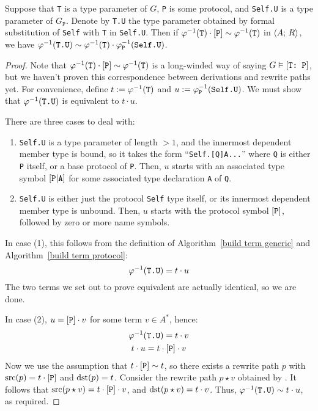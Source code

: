\documentclass[../generics]{subfiles}
\begin{document}
\begin{lemma}\label{type param composition lemma}
Suppose that \texttt{T} is a type parameter of $G$, \texttt{P} is some protocol, and \texttt{Self.U} is a type parameter of $G_\texttt{P}$. Denote by \texttt{T.U} the type parameter obtained by formal substitution of \texttt{Self} with \texttt{T} in \texttt{Self.U}. Then if $\varphi^{-1}(\texttt{T})\cdot[\texttt{P}]\sim\varphi^{-1}(\texttt{T})$ in $\langle A;\,R\rangle$, we have $\varphi^{-1}(\texttt{T.U})\sim\varphi^{-1}(\texttt{T})\cdot\varphi^{-1}_\texttt{P}(\texttt{Self.U})$.
\end{lemma}
\begin{proof}
Note that $\varphi^{-1}(\texttt{T})\cdot[\texttt{P}]\sim\varphi^{-1}(\texttt{T})$ is a long-winded way of saying $G\vDash[\texttt{T:~P}]$, but we haven't proven this correspondence between derivations and rewrite paths yet. For convenience, define $t:=\varphi^{-1}(\texttt{T})$ and $u:=\varphi^{-1}_\texttt{P}(\texttt{Self.U})$. We must show that $\varphi^{-1}(\texttt{T.U})$ is equivalent to $t\cdot u$.

There are three cases to deal with:
\begin{enumerate}
\item \texttt{Self.U} is a type parameter of length $>1$, and the innermost dependent member type is bound, so it takes the form ``\texttt{Self.[Q]A...}'' where \texttt{Q} is either \texttt{P} itself, or a base protocol of \texttt{P}. Then, $u$ starts with an associated type symbol $[\texttt{P}|\texttt{A}]$ for some associated type declaration \texttt{A} of \texttt{Q}.
\item \texttt{Self.U} is either just the protocol \texttt{Self} type itself, or its innermost dependent member type is unbound. Then, $u$ starts with the protocol symbol $[\texttt{P}]$, followed by zero or more name symbols.
\end{enumerate}

In case (1), this follows from the definition of Algorithm~\ref{build term generic} and Algorithm~\ref{build term protocol}:
\[\varphi^{-1}(\texttt{T.U})=t\cdot u\]
The two terms we set out to prove equivalent are actually identical, so we are done.

In case (2), $u=[\texttt{P}]\cdot v$ for some term $v\in A^*$, hence:
\begin{gather*}
\varphi^{-1}(\texttt{T.U})=t\cdot v\\
t\cdot u=t\cdot [\texttt{P}]\cdot v
\end{gather*}
Now we use the assumption that $t\cdot[\texttt{P}]\sim t$, so there exists a rewrite path $p$ with $\operatorname{src}(p)=t\cdot[\texttt{P}]$ and $\operatorname{dst}(p)=t$. Consider the rewrite path $p\star v$ obtained by . It follows that $\operatorname{src}(p\star v)=t\cdot[\texttt{P}]\cdot v$, and $\operatorname{dst}(p\star v)=t\cdot v$. Thus,
$\varphi^{-1}(\texttt{T.U})\sim t\cdot u$, as required.
\end{proof}
\end{document}
